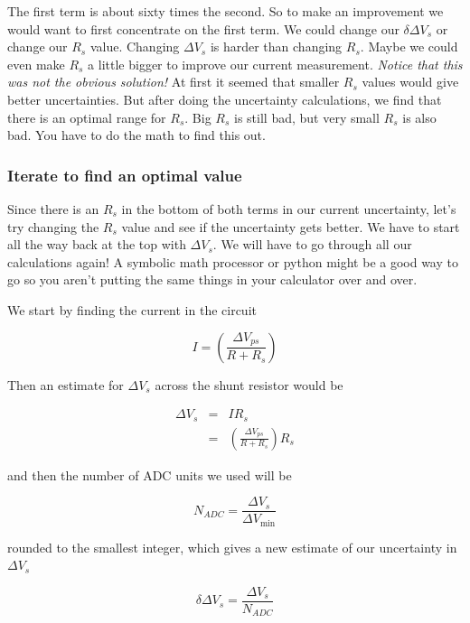 The first term is about sixty times the second. So to make an improvement we would want to first concentrate on the first term. We could change our $\delta \Delta V_{s}$ or change our $R_{s}$ value. Changing $\Delta V_{s}$ is harder than changing $R_{s}.$ Maybe we could even make $R_{s}$ a little
bigger to improve our current measurement. \emph{Notice that this was not
the obvious solution!} At first it seemed that smaller $R_{s}$ values would
give better uncertainties. But after doing the uncertainty calculations, we
find that there is an optimal range for $R_{s}.$ Big $R_{s}$ is still bad,
but very small $R_{s}$ is also bad. You have to do the math to find this out.

\subsubsection{Iterate to find an optimal value}

Since there is an $R_{s}$ in the bottom of both terms in our current uncertainty, let's try changing the $R_{s}$ value and see if the uncertainty gets better. We have to start all the way back at the top with $\Delta V_{s}. $ We will have to go through all our calculations again! A symbolic math processor or python might be a good way to go so you aren't putting the same things in your calculator over and over.

We start by finding the current in the circuit

\begin{equation*}
	I=\left( \frac{\Delta V_{ps}}{R+R_{s}}\right)
\end{equation*}

\noindent Then an estimate for $\Delta V_{s}$ across the shunt resistor would be

\begin{eqnarray*}
	\Delta V_{s} &=&IR_{s} \\ &=&\left( \frac{\Delta V_{ps}}{R+R_{s}}\right) R_{s}
\end{eqnarray*}

\noindent and then the number of ADC units we used will be 

\begin{equation*}
	N_{ADC}=\frac{\Delta V_{s}}{\Delta V_{\min }}
\end{equation*}

\noindent rounded to the smallest integer, which gives a new estimate of our uncertainty in $\Delta V_{s}$ 

\begin{equation*}
	\delta \Delta V_{s}=\frac{\Delta V_{s}}{N_{ADC}}
\end{equation*}

